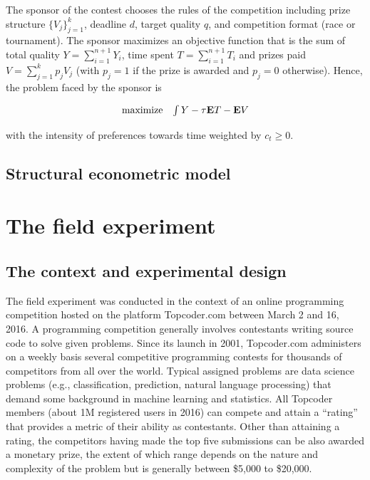 \documentclass[12pt,]{article}
\begin{document}
The sponsor of the contest chooses the rules of the competition
including prize structure \(\{V_j\}_{j=1}^k\), deadline \(d\), target
quality \(q\), and competition format (race or tournament). The sponsor
maximizes an objective function that is the sum of total quality
\(Y=\sum_{i=1}^{n+1} Y_i\), time spent \(T=\sum_{i=1}^{n+1} T_i\) and
prizes paid \(V=\sum_{j=1}^k p_{j} V_j\) (with \(p_j=1\) if the prize is
awarded and \(p_j=0\) otherwise). Hence, the problem faced by the
sponsor is

\[\begin{array}{ll}
    \mbox{maximize} & \int {Y}   -  {\tau}{{\bf E}}{T} - {{\bf E}}{V}
  \end{array}\]

with the intensity of preferences towards time weighted by
\(c_t\geq 0\).

\subsection{Structural econometric
model}\label{structural-econometric-model}

\section{The field experiment}\label{the-field-experiment}

\subsection{The context and experimental
design}\label{the-context-and-experimental-design}

The field experiment was conducted in the context of an online
programming competition hosted on the platform Topcoder.com between
March 2 and 16, 2016. A programming competition generally involves
contestants writing source code to solve given problems. Since its
launch in 2001, Topcoder.com administers on a weekly basis several
competitive programming contests for thousands of competitors from all
over the world. Typical assigned problems are data science problems
(e.g., classification, prediction, natural language processing) that
demand some background in machine learning and statistics. All Topcoder
members (about 1M registered users in 2016) can compete and attain a
``rating'' that provides a metric of their ability as contestants. Other
than attaining a rating, the competitors having made the top five
submissions can be also awarded a monetary prize, the extent of which
range depends on the nature and complexity of the problem but is
generally between \$5,000 to \$20,000.
\end{document}
